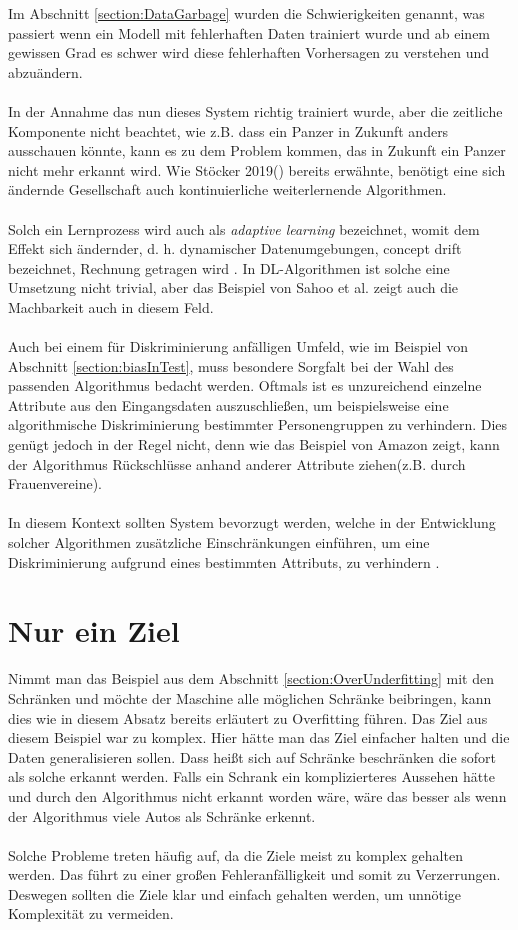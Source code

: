 \documentclass[12pt,oneside,a4paper,parskip]{scrbook}
\begin{document}
Im Abschnitt \ref{section:DataGarbage} wurden die Schwierigkeiten genannt, was passiert wenn ein Modell mit fehlerhaften Daten trainiert wurde und ab einem gewissen Grad es schwer wird diese fehlerhaften Vorhersagen zu verstehen und abzuändern.
\\\\
In der Annahme das nun dieses System richtig trainiert wurde, aber die zeitliche Komponente nicht beachtet, wie z.B. dass ein Panzer in Zukunft anders ausschauen könnte, kann es zu dem Problem kommen, das in Zukunft ein Panzer nicht mehr erkannt wird. Wie Stöcker 2019(\cite{stoecker}) bereits erwähnte, benötigt eine sich ändernde Gesellschaft auch kontinuierliche weiterlernende Algorithmen.
\\\\
Solch ein Lernprozess wird auch als \textit{adaptive learning} bezeichnet, womit dem Effekt sich ändernder, d. h. dynamischer Datenumgebungen, concept drift bezeichnet, Rechnung getragen wird \cite{gama}. In DL-Algorithmen ist solche eine Umsetzung nicht trivial, aber das Beispiel von Sahoo et al. \cite{sahoo} zeigt auch die Machbarkeit auch in diesem Feld.
\\\\
Auch bei einem für Diskriminierung anfälligen Umfeld, wie im Beispiel von Abschnitt \ref{section:biasInTest}, muss besondere Sorgfalt bei der Wahl des passenden Algorithmus bedacht werden. Oftmals ist es unzureichend einzelne Attribute aus den Eingangsdaten auszuschließen, um beispielsweise eine algorithmische Diskriminierung bestimmter Personengruppen zu verhindern. Dies genügt jedoch in der Regel nicht, denn wie das Beispiel von Amazon zeigt, kann der Algorithmus Rückschlüsse anhand anderer Attribute ziehen(z.B. durch Frauenvereine).
\\\\
In diesem Kontext sollten System bevorzugt werden, welche in der Entwicklung solcher Algorithmen zusätzliche Einschränkungen einführen, um eine Diskriminierung aufgrund eines bestimmten Attributs, zu verhindern \cite{kamiran}.

\section{Nur ein Ziel}
\label{section:oneGoal}
Nimmt man das Beispiel aus dem Abschnitt \ref{section:OverUnderfitting} mit den Schränken und möchte der Maschine alle möglichen Schränke beibringen, kann dies wie in diesem Absatz bereits erläutert zu Overfitting führen. Das Ziel aus diesem Beispiel war zu komplex. Hier hätte man das Ziel einfacher halten und die Daten generalisieren sollen. Dass heißt sich auf Schränke beschränken die sofort als solche erkannt werden. Falls ein Schrank ein komplizierteres Aussehen hätte und durch den Algorithmus nicht erkannt worden wäre, wäre das besser als wenn der Algorithmus viele Autos als Schränke erkennt.
\\\\
Solche Probleme treten häufig auf, da die Ziele meist zu komplex gehalten werden. Das führt zu einer großen Fehleranfälligkeit und somit zu Verzerrungen. Deswegen sollten die Ziele klar und einfach gehalten werden, um unnötige Komplexität zu vermeiden.
\end{document}
